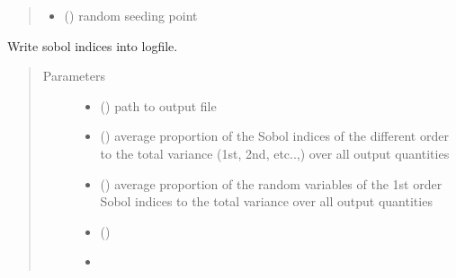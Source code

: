 \documentclass[letterpaper,10pt,english,openany,oneside]{sphinxmanual}
\begin{document}
\begin{fulllineitems}
\begin{fulllineitems}
\begin{quote}
\begin{description}
\begin{itemize}
\item {} 
 (\sphinxstyleliteralemphasis{\sphinxupquote{, }}\sphinxstyleliteralemphasis{\sphinxupquote{, }}) \textendash{} random seeding point

\end{itemize}

\end{description}\end{quote}

\end{fulllineitems}


\begin{fulllineitems}
\label{\detokenize{pygpc:pygpc.gpc.gPC.write_log_sobol}}
Write sobol indices into logfile.
\begin{quote}\begin{description}
\item[{Parameters}] \leavevmode\begin{itemize}
\item {} 
 () \textendash{} path to output file

\item {} 
 () \textendash{} average proportion of the Sobol indices of the different order to the total variance (1st, 2nd, etc..,)
over all output quantities

\item {} 
 () \textendash{} average proportion of the random variables of the 1st order Sobol indices to the total variance over all
output quantities

\item {} 
 () \textendash{} 

\item {} 
 \textendash{} 

\end{itemize}

\end{description}\end{quote}

\end{fulllineitems}


\end{fulllineitems}
\end{document}
